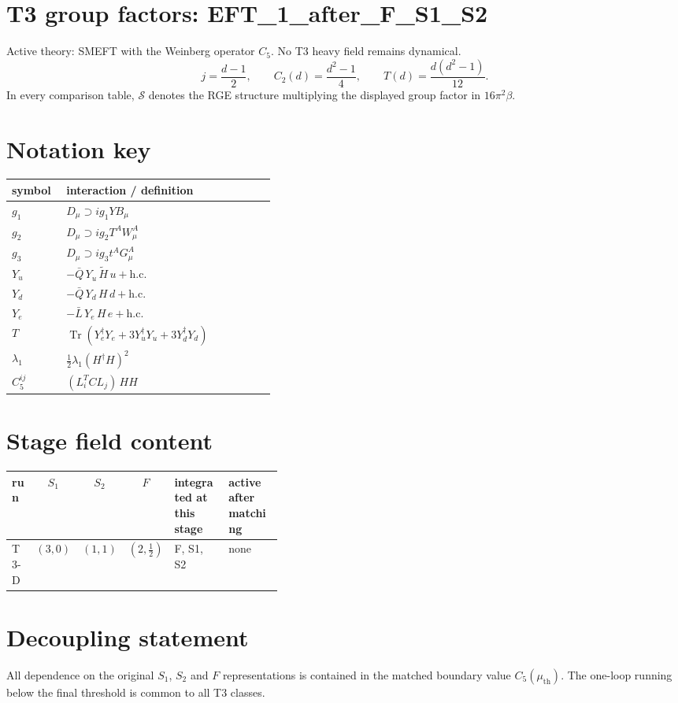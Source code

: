 \documentclass[9pt]{article}
\begin{document}
\section*{T3 group factors: EFT\_1\_after\_F\_S1\_S2}
Active theory: SMEFT with the Weinberg operator $C_5$.  No T3 heavy field remains dynamical.
\[j=\frac{d-1}{2},\qquad C_2(d)=\frac{d^2-1}{4},\qquad T(d)=\frac{d(d^2-1)}{12}.\]
In every comparison table, $\mathcal{S}$ denotes the RGE structure multiplying the displayed group factor in $16\pi^2\beta$.
\section*{Notation key}
\begin{longtable}{@{}p{0.19\linewidth}p{0.73\linewidth}@{}}
\toprule
symbol & interaction / definition \\
\midrule
$g_1$ & $D_\mu\supset i g_1 Y B_\mu$ \\
$g_2$ & $D_\mu\supset i g_2 T^A W_\mu^A$ \\
$g_3$ & $D_\mu\supset i g_3 t^A G_\mu^A$ \\
$Y_u$ & $-\bar Q\,Y_u\,\widetilde H\,u+\mathrm{h.c.}$ \\
$Y_d$ & $-\bar Q\,Y_d\,H\,d+\mathrm{h.c.}$ \\
$Y_e$ & $-\bar L\,Y_e\,H\,e+\mathrm{h.c.}$ \\
$T$ & $\operatorname{Tr}\!\left(Y_e^\dagger Y_e+3Y_u^\dagger Y_u+3Y_d^\dagger Y_d\right)$ \\
$\lambda_1$ & $\frac12\lambda_1(H^\dagger H)^2$ \\
$C_5^{ij}$ & $(L_i^T C L_j)\,H H$ \\
\bottomrule
\end{longtable}
\section*{Stage field content}
\begin{longtable}{@{}lccc p{0.20\linewidth}p{0.20\linewidth}@{}}
\toprule
run & $S_1$ & $S_2$ & $F$ & integrated at this stage & active after matching \\
\midrule
T3-D & $(3,0)$ & $(1,1)$ & $(2,\frac{1}{2})$ & F, S1, S2 & none \\
\bottomrule
\end{longtable}
\section*{Decoupling statement}
All dependence on the original $S_1$, $S_2$ and $F$ representations is contained in the matched boundary value $C_5(\mu_{\mathrm{th}})$.  The one-loop running below the final threshold is common to all T3 classes.
\end{document}
